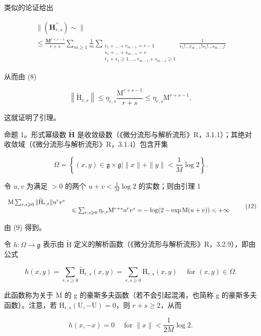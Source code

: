 类似的论证给出

\[
\begin{array}{l}\| (\mathbf{H}_{r,s}^{\prime \prime})\sim \| \\ \leqslant \frac{\mathbf{M}^{r + s - 1}}{r + s}\sum_{m\geqslant 1}\frac{1}{m}\sum_{\substack{r_{1} + \dots +r_{m - 1} = r - 1\\ s_{1} + \dots +s_{m - 1} = s\\ r_{1} + s_{1}\geqslant 1,\ldots ,r_{m - 1} + s_{m - 1}\geqslant 1}}\frac{1}{r_{1}!\ldots r_{m - 1}!s_{1}!\ldots s_{m - 1}!} \end{array}\tag{11}
\]

从而由 (8)

\[
\left\| \tilde {\mathrm{H}} _ {r, s} \right\| \leqslant   \eta_ {r, s} \frac {\mathrm{M} ^ {r + s - 1}}{r + s} \leqslant \eta_ {r, s} \mathrm{M} ^ {r + s - 1},
\]

这就证明了引理。

命题 1。形式幂级数 \(\tilde{\mathbf{H}}\) 是收敛级数（《微分流形与解析流形》R，3.1.1）；其绝对收敛域（《微分流形与解析流形》R，3.1.4）包含开集

\[
\Omega = \left\{(x, y) \in \mathfrak {g} \times \mathfrak {g} | \| x \| + \| y \| <   \frac {1}{M} \log 2 \right\}.
\]

令 \(u, v\) 为满足 \(> 0\) 的两个 \(u + v < \frac{1}{M} \log 2\) 的实数；则由引理 1

\[
\begin{array}{r l} \mathrm{M} \sum_ {r, s \geqslant 0} \| \tilde {\mathrm{H}} _ {r, s} \| u ^ {r} v ^ {s} \\ & \leqslant \sum_ {r, s \geqslant 0} \eta_ {r, s} \mathrm{M} ^ {r + s} u ^ {r} v ^ {s} = - \log (2 - \exp \mathrm{M} (u + v)) <   + \infty \end{array} \tag {12}
\]

由 (9) 得到。

令 \(h: \Omega \to \mathfrak{g}\) 表示由 \(\tilde{\mathrm{H}}\) 定义的解析函数（《微分流形与解析流形》R，3.2.9），即由公式

\[
h (x, y) = \sum_ {r, s \geqslant 0} \tilde {\mathrm{H}} _ {r, s} (x, y) = \sum_ {r, s \geqslant 0} \mathrm{H} _ {r, s} (x, y) \quad \text { for } (x, y) \in \Omega .\tag{13}
\]

此函数称为关于 M 的 g 的豪斯多夫函数（若不会引起混淆，也简称 g 的豪斯多夫函数）。注意，若 \(\mathrm{H}_{r,s}(\mathrm{U}, -\mathrm{U}) = 0\)，则 \(r + s \geqslant 2\)，从而

\[
h (x, - x) = 0 \quad \text { for } \| x \| <   \frac {1}{2 M} \log 2.\tag{14}
\]

